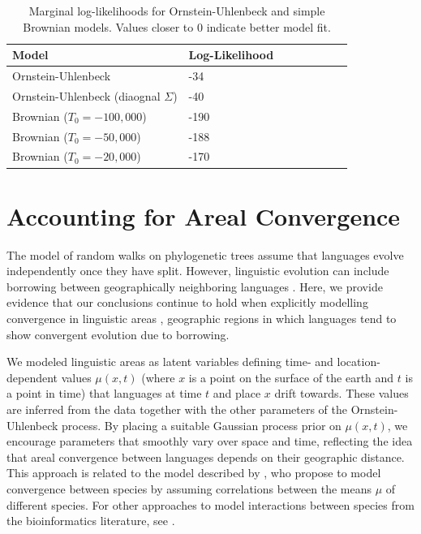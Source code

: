 \documentclass[11pt,a4paper]{article}
\begin{document}
\begin{table}
	\begin{center}
	\begin{tabular}{llllllll}
	Model & Log-Likelihood \\ \hline
	Ornstein-Uhlenbeck & -34 \\
	Ornstein-Uhlenbeck (diaognal $\Sigma$) & -40 \\
	Brownian ($T_0 = -100,000$) & -190 \\
	Brownian ($T_0 = -50,000$) & -188 \\
	Brownian ($T_0 = -20,000$) & -170
\end{tabular}
	\end{center}
	\caption{Marginal log-likelihoods for Ornstein-Uhlenbeck and simple Brownian models. Values closer to $0$ indicate better model fit.}
	\label{tab:marg-brown}
\end{table}

\section{Accounting for Areal Convergence}
The model of random walks on phylogenetic trees assume that languages evolve independently once they have split.
However, linguistic evolution can include borrowing between geographically neighboring languages \citep[e.g.][]{dryer1989large, bisang1996areal, heine2003on, aikhenvald2007grammars,  kalyan2019problems}.
Here, we provide evidence that our conclusions continue to hold when explicitly modelling convergence in linguistic areas \citep[e.g.][]{campbell1986meso, nichols1992linguistic, haspelmath2001the, gijn2017linguistic}, geographic regions in which languages tend to show convergent evolution due to borrowing.

We modeled linguistic areas as latent variables defining time- and location-dependent values $\mu(x,t)$ (where $x$ is a point on the surface of the earth and $t$ is a point in time) that languages at time $t$ and place $x$ drift towards.
These values are inferred from the data together with the other parameters of the Ornstein-Uhlenbeck process.
By placing a suitable Gaussian process prior on $\mu(x,t)$, we encourage parameters that smoothly vary over space and time, reflecting the idea that areal convergence between languages depends on their geographic distance.
This approach is related to the model described by \citep{nuismer2015predicting}, who propose to model convergence between species by assuming correlations between the means $\mu$ of different species.
For other approaches to model interactions between species from the bioinformatics literature, see \citet{manceau2016a,drury2016estimating, bartoszek2017using, drury2018an}.
\end{document}
